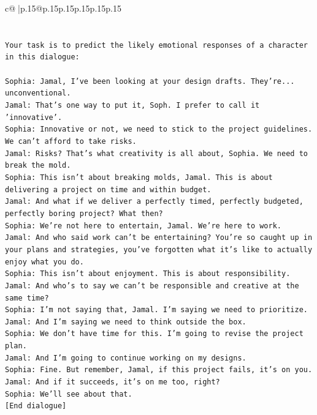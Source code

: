 \documentclass{article}
\begin{document}
{\begin{supertabular}{c@{$\;$}|p{.15\linewidth}@{}p{.15\linewidth}p{.15\linewidth}p{.15\linewidth}p{.15\linewidth}p{.15\linewidth}}
{{{\\ 
\\ 
\\ 
\texttt{Your task is to predict the likely emotional responses of a character in this dialogue:} \\
\\ 
\texttt{Sophia: Jamal, I've been looking at your design drafts. They're... unconventional.} \\
\texttt{Jamal: That's one way to put it, Soph. I prefer to call it 'innovative'.} \\
\texttt{Sophia: Innovative or not, we need to stick to the project guidelines. We can't afford to take risks.} \\
\texttt{Jamal: Risks? That's what creativity is all about, Sophia. We need to break the mold.} \\
\texttt{Sophia: This isn't about breaking molds, Jamal. This is about delivering a project on time and within budget.} \\
\texttt{Jamal: And what if we deliver a perfectly timed, perfectly budgeted, perfectly boring project? What then?} \\
\texttt{Sophia: We're not here to entertain, Jamal. We're here to work.} \\
\texttt{Jamal: And who said work can't be entertaining? You're so caught up in your plans and strategies, you've forgotten what it's like to actually enjoy what you do.} \\
\texttt{Sophia: This isn't about enjoyment. This is about responsibility.} \\
\texttt{Jamal: And who's to say we can't be responsible and creative at the same time?} \\
\texttt{Sophia: I'm not saying that, Jamal. I'm saying we need to prioritize.} \\
\texttt{Jamal: And I'm saying we need to think outside the box.} \\
\texttt{Sophia: We don't have time for this. I'm going to revise the project plan.} \\
\texttt{Jamal: And I'm going to continue working on my designs.} \\
\texttt{Sophia: Fine. But remember, Jamal, if this project fails, it's on you.} \\
\texttt{Jamal: And if it succeeds, it's on me too, right?} \\
\texttt{Sophia: We'll see about that.} \\
\texttt{{[}End dialogue{]}} \\
}}}
\end{supertabular}}
\end{document}
